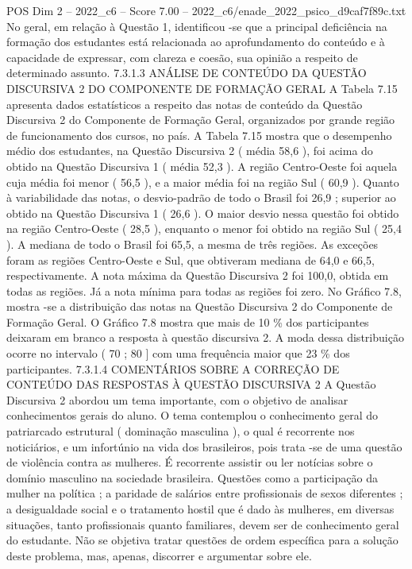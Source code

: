 \begin{textsample}{POS Dim 2 – 2022\_c6 – Score 7.00 – 2022\_c6/enade\_2022\_psico\_d9caf7f89c.txt}
No geral, em relação à Questão 1, identificou -se que a principal deficiência na formação dos estudantes está relacionada ao aprofundamento do conteúdo e à capacidade de expressar, com clareza e coesão, sua opinião a respeito de determinado assunto. 7.3.1.3 ANÁLISE DE CONTEÚDO DA QUESTÃO DISCURSIVA 2 DO COMPONENTE DE FORMAÇÃO GERAL A Tabela 7.15 apresenta dados estatísticos a respeito das notas de conteúdo da Questão Discursiva 2 do Componente de Formação Geral, organizados por grande região de funcionamento dos cursos, no país.
A Tabela 7.15 mostra que o desempenho médio dos estudantes, na Questão Discursiva 2 ( média 58,6 ), foi acima do obtido na Questão Discursiva 1 ( média 52,3 ).
A região Centro-Oeste foi aquela cuja média foi menor ( 56,5 ), e a maior média foi na região Sul ( 60,9 ).
Quanto à variabilidade das notas, o desvio-padrão de todo o Brasil foi 26,9 ; superior ao obtido na Questão Discursiva 1 ( 26,6 ).
O maior desvio nessa questão foi obtido na região Centro-Oeste ( 28,5 ), enquanto o menor foi obtido na região Sul ( 25,4 ).
A mediana de todo o Brasil foi 65,5, a mesma de três regiões.
As exceções foram as regiões Centro-Oeste e Sul, que obtiveram mediana de 64,0 e 66,5, respectivamente.
A nota máxima da Questão Discursiva 2 foi 100,0, obtida em todas as regiões.
Já a nota mínima para todas as regiões foi zero.
No Gráfico 7.8, mostra -se a distribuição das notas na Questão Discursiva 2 do Componente de Formação Geral.
O Gráfico 7.8 mostra que mais de 10 \% dos participantes deixaram em branco a resposta à questão discursiva 2.
A moda dessa distribuição ocorre no intervalo ( 70 ; 80 ] com uma frequência maior que 23 \% dos participantes. 7.3.1.4 COMENTÁRIOS SOBRE A CORREÇÃO DE CONTEÚDO DAS RESPOSTAS À QUESTÃO DISCURSIVA 2 A Questão Discursiva 2 abordou um tema importante, com o objetivo de analisar conhecimentos gerais do aluno.
O tema contemplou o conhecimento geral do patriarcado estrutural ( dominação masculina ), o qual é recorrente nos noticiários, e um infortúnio na vida dos brasileiros, pois trata -se de uma questão de violência contra as mulheres.
É recorrente assistir ou ler notícias sobre o domínio masculino na sociedade brasileira.
Questões como a participação da mulher na política ; a paridade de salários entre profissionais de sexos diferentes ; a desigualdade social e o tratamento hostil que é dado às mulheres, em diversas situações, tanto profissionais quanto familiares, devem ser de conhecimento geral do estudante.
Não se objetiva tratar questões de ordem específica para a solução deste problema, mas, apenas, discorrer e argumentar sobre ele.

\end{textsample}
